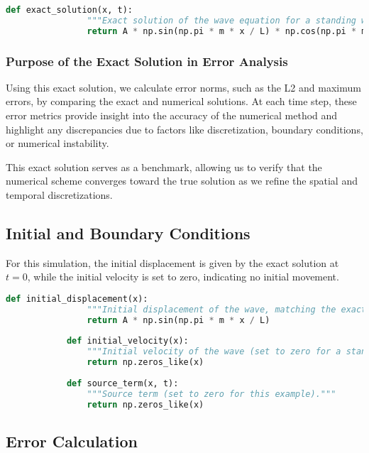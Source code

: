 \documentclass{article}
\begin{document}
		 \begin{lstlisting}[language=Python]
		 	def exact_solution(x, t):
			 	"""Exact solution of the wave equation for a standing wave."""
			 	return A * np.sin(np.pi * m * x / L) * np.cos(np.pi * m * c * t / L)
		 \end{lstlisting}
		 
		 \subsubsection{Purpose of the Exact Solution in Error Analysis}
		 
		 Using this exact solution, we calculate error norms, such as the L2 and maximum errors, by comparing the exact and numerical solutions. At each time step, these error metrics provide insight into the accuracy of the numerical method and highlight any discrepancies due to factors like discretization, boundary conditions, or numerical instability.
		 
		 This exact solution serves as a benchmark, allowing us to verify that the numerical scheme converges toward the true solution as we refine the spatial and temporal discretizations.
		 
		 
		 \subsection{Initial and Boundary Conditions}
		 
		 For this simulation, the initial displacement is given by the exact solution at \( t = 0 \), while the initial velocity is set to zero, indicating no initial movement.
		 
		 \begin{lstlisting}[language=Python]
		 	def initial_displacement(x):
			 	"""Initial displacement of the wave, matching the exact solution."""
		 		return A * np.sin(np.pi * m * x / L)
		 	
		 	def initial_velocity(x):
		 		"""Initial velocity of the wave (set to zero for a standing wave)."""
		 		return np.zeros_like(x)
		 	
		 	def source_term(x, t):
		 		"""Source term (set to zero for this example)."""
		 		return np.zeros_like(x)
		 \end{lstlisting}
		 
		 \subsection{Error Calculation}
		 
\end{document}
